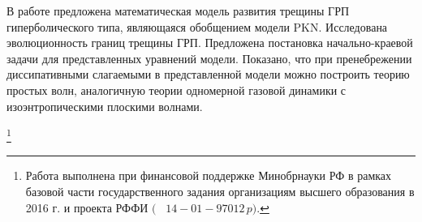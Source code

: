 
В работе предложена математическая модель развития трещины ГРП гиперболического типа, являющаяся обобщением модели PKN. Исследована эволюционность границ трещины ГРП. Предложена постановка начально-краевой задачи для представленных уравнений модели. Показано, что при пренебрежении диссипативными слагаемыми в представленной модели можно построить теорию простых волн, аналогичную теории одномерной газовой динамики с изоэнтропическими плоскими волнами.



{\thanks{Работа выполнена при финансовой поддержке Минобрнауки РФ в рамках базовой части государственного задания организациям высшего образования в 2016 г. и проекта РФФИ $($ \rm \No~$14{-}01{-}97012\,p).$}}






